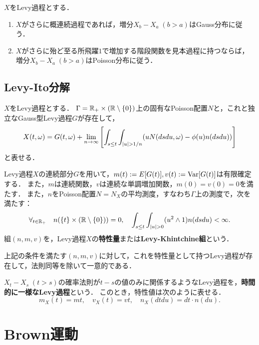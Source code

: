 \documentclass[uplatex,dvipdfmx]{jsreport}
\begin{document}
\begin{theorem}[Gauss型とPoisson型Levy過程]
    $X$をLevy過程とする．
    \begin{enumerate}
        \item $X$がさらに概連続過程であれば，増分$X_b-X_a\;(b>a)$はGauss分布に従う．
        \item $X$がさらに殆ど至る所飛躍$1$で増加する階段関数を見本過程に持つならば，増分$X_b-X_a\;(b>a)$はPoisson分布に従う．
    \end{enumerate}
\end{theorem}

\subsection{Levy-Ito分解}

\begin{theorem}
    $X$をLevy過程とする．
    $\Gamma=\mathbb{R}_+\times(\mathbb{R}\setminus\{0\})$上の固有なPoisson配置$N$と，これと独立なGauss型Levy過程$G$が存在して，
    \[X(t,\omega)=G(t,\omega)+\lim_{n\to\infty}\left[\int_{s\le t}\int_{\lvert u\rvert>1/n}(uN(dsdu,\omega)-\phi(u)n(dsdu))\right]\]
    と表せる．
\end{theorem}

\begin{definition}
    Levy過程$X$の連続部分$G$を用いて，$m(t):=E[G(t)],v(t):=\mathrm{Var}[G(t)]$は有限確定する．
    また，$m$は連続関数，$v$は連続な単調増加関数，$m(0)=v(0)=0$を満たす．
    また，$n$をPoisson配置$N=N_X$の平均測度，すなわち$\Gamma$上の測度で，次を満たす：
    \[\forall_{t\in\mathbb{R}_+}\quad n(\{t\}\times(\mathbb{R}\setminus\{0\}))=0,\quad\int_{s\le t}\int_{\lvert u\rvert>0}(u^2\land 1)n(dsdu)<\infty.\]
    組$(n,m,v)$を，Levy過程$X$の\textbf{特性量}または\textbf{Levy-Khintchine組}という．
\end{definition}

\begin{theorem}
    上記の条件を満たす$(n,m,v)$に対して，これを特性量として持つLevy過程が存在して，法則同等を除いて一意的である．
\end{theorem}

\begin{definition}
    $X_t-X_s\;(t>s)$の確率法則が$t-s$の値のみに関係するようなLevy過程を，\textbf{時間的に一様なLevy過程}という．
    このとき，特性値は次のように表せる．
    \[m_X(t)=mt,\quad v_X(t)=vt,\quad n_X(dtdu)=dt\cdot n(du).\]
\end{definition}

\section{Brown運動}
\end{document}
